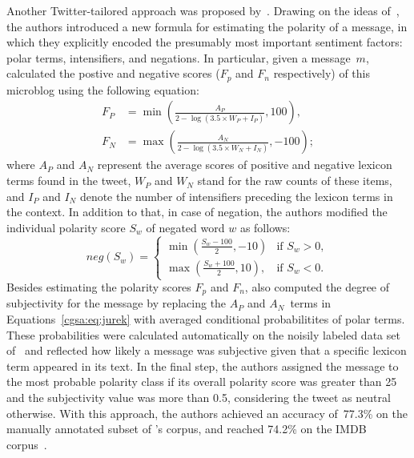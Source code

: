 Another Twitter-tailored approach was proposed by~\citet{Jurek:15}.
Drawing on the ideas of~\citet{Taboada:11}, the authors introduced a
new formula for estimating the polarity of a message, in which they
explicitly encoded the presumably most important sentiment factors:
polar terms, intensifiers, and negations.  In particular, given a
message~$m$, \citet{Jurek:15} calculated the postive and negative
scores ($F_p$ and $F_n$ respectively) of this microblog using the
following equation:%
{ \small%
  \begin{align}
    F_P &= \min\left(\frac{A_P}{2 - \log(3.5\times W_P + I_P)}, 100\right),\\
    F_N &= \max\left(\frac{A_N}{2 - \log(3.5\times W_N + I_N)}, -100\right);\label{cgsa:eq:jurek}
  \end{align}%
  \normalsize%
}%
where $A_P$ and $A_N$ represent the average scores of positive and
negative lexicon terms found in the tweet, $W_P$ and $W_N$ stand for
the raw counts of these items, and $I_P$ and $I_N$ denote the number
of intensifiers preceding the lexicon terms in the context.  In
addition to that, in case of negation, the authors modified the
individual polarity score $S_w$ of negated word $w$ as follows: {
  \small%
  \begin{equation*}
neg(S_w) =
    \begin{cases}
        \min\left(\frac{S_w - 100}{2}, -10\right) & \text{if } S_w > 0,\\
        \max\left(\frac{S_w + 100}{2}, 10\right), & \text{if } S_w < 0.
    \end{cases}
\end{equation*}%
\normalsize%
}%
Besides estimating the polarity scores $F_p$ and $F_n$,
\citeauthor{Jurek:15} also computed the degree of subjectivity for the
message by replacing the $A_P$ and $A_N$~terms in
Equations~\ref{cgsa:eq:jurek} with averaged conditional probabilitites
of polar terms.  These probabilities were calculated automatically on
the noisily labeled data set of~\citet{Go:09} and reflected how likely
a message was subjective given that a specific lexicon term appeared
in its text.  In the final step, the authors assigned the message to
the most probable polarity class if its overall polarity score was
greater than 25 and the subjectivity value was more than 0.5,
considering the tweet as neutral otherwise.  With this approach, the
authors achieved an accuracy of~77.3\% on the manually annotated
subset of \citeauthor{Go:09}'s corpus, and reached 74.2\% on the IMDB
corpus~\cite{Maas:11}.

